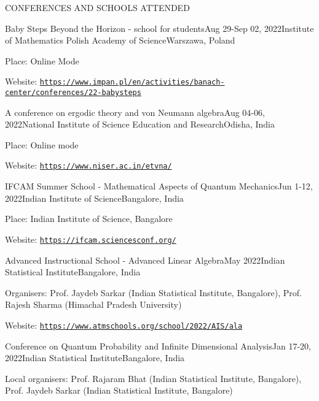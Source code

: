 \documentclass{resume} %
\newcommand{\weblink}[1]{\texttt{\href{#1}{#1}}}
\begin{document}
\begin{rSection}{CONFERENCES AND SCHOOLS ATTENDED}
	
	\begin{rSubsection}{Baby Steps Beyond the Horizon - school for students}{Aug 29-Sep 02, 2022}{Institute of Mathematics Polish Academy of Science}{Warszawa, Poland}
		\item Place: Online Mode
		\item Website: \weblink{https://www.impan.pl/en/activities/banach-center/conferences/22-babysteps}
	\end{rSubsection}
	
	\begin{rSubsection}{A conference on ergodic theory and von Neumann algebra}{Aug 04-06, 2022}{National Institute of Science Education and Research}{Odisha, India}
		\item Place: Online mode
		\item Website: \weblink{https://www.niser.ac.in/etvna/}
	\end{rSubsection}

	\begin{rSubsection}{IFCAM Summer School - Mathematical Aspects of Quantum Mechanics}{Jun 1-12, 2022}{Indian Institute of Science}{Bangalore, India}
		\item Place: Indian Institute of Science, Bangalore
		\item Website: \weblink{https://ifcam.sciencesconf.org/}
	\end{rSubsection}
	
	\begin{rSubsection}{Advanced Instructional School - Advanced Linear Algebra}{May 2022}{Indian Statistical Institute}{Bangalore, India}
		\item Organisers: Prof. Jaydeb Sarkar (Indian Statistical Institute, Bangalore), Prof. Rajesh Sharma (Himachal Pradesh University)
		
		\item Website: \weblink{https://www.atmschools.org/school/2022/AIS/ala}
	\end{rSubsection}

	\begin{rSubsection}{Conference on Quantum Probability and Infinite Dimensional Analysis}{Jan 17-20, 2022}{Indian Statistical Institute}{Bangalore, India}
		\item Local organisers: Prof. Rajaram Bhat (Indian Statistical Institute, Bangalore), Prof. Jaydeb Sarkar (Indian Statistical Institute, Bangalore)
		

\end{rSubsection}
\end{rSection}
\end{document}
